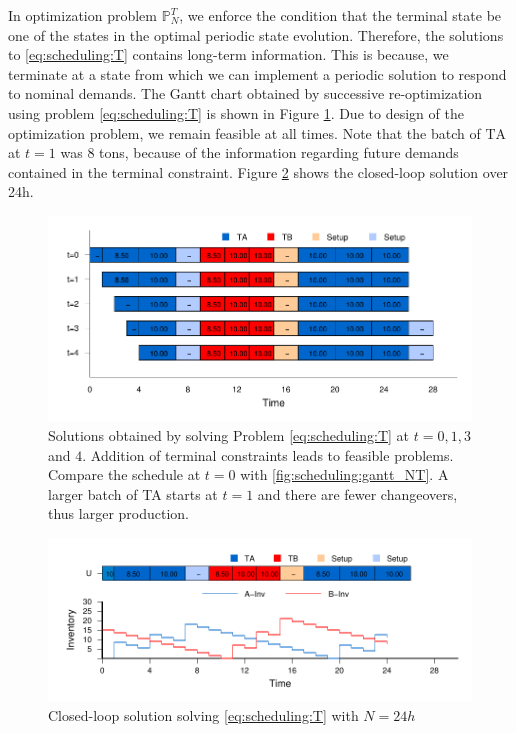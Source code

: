 In optimization problem $\mathbb{P}_N^T$, we enforce the condition
that the terminal state be one of the states in the optimal periodic
state evolution. Therefore, the solutions to \eqref{eq:scheduling:T}
contains long-term information. This is because, we terminate at a
state from which we can implement a periodic solution to respond to
nominal demands. The Gantt chart obtained by successive
re-optimization using problem \eqref{eq:scheduling:T} is shown in
Figure \ref{fig:scheduling:gantt_Terminal}. Due to design of the
optimization problem, we remain feasible at all times. Note that the
batch of $\text{TA}$ at $t=1$ was 8 tons, because of the information
regarding future demands contained in the terminal constraint. Figure
\ref{fig:scheduling:T_24_CL} shows the closed-loop solution over 24h.

\begin{figure}
\begin{center}
\includegraphics{scheduling/gantt_24.pdf}
\caption[Recursive feasibility with terminal constraints]{Solutions
  obtained by solving Problem \eqref{eq:scheduling:T} 
at $t=0,1,3$ and $4$. Addition of terminal constraints leads to
feasible problems. Compare the schedule at $t=0$ with
\ref{fig:scheduling:gantt_NT}. A larger batch of TA starts at $t=1$
and there are fewer changeovers, thus larger production.}
\label{fig:scheduling:gantt_Terminal}
\end{center}

\end{figure}
\begin{figure}

\begin{center}
\includegraphics{scheduling/T_24_CL.pdf}
\caption{Closed-loop solution solving \eqref{eq:scheduling:T} with
  $N=24h$}
\label{fig:scheduling:T_24_CL}
\end{center}
\end{figure}

